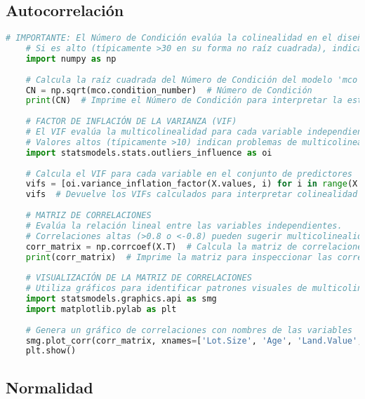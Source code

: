 \documentclass[a4paper,12pt]{article}
\begin{document}
\subsection{Autocorrelación}

\begin{lstlisting}[language=Python, style=custompython, caption={Cálculo del Número de Condición, Factor de Inflación de la Varianza (VIF) y Matriz de Correlaciones.}]
    # IMPORTANTE: El Número de Condición evalúa la colinealidad en el diseño del modelo.
    # Si es alto (típicamente >30 en su forma no raíz cuadrada), indica posible multicolinealidad.
    import numpy as np
    
    # Calcula la raíz cuadrada del Número de Condición del modelo 'mco'
    CN = np.sqrt(mco.condition_number)  # Número de Condición
    print(CN)  # Imprime el Número de Condición para interpretar la estabilidad numérica
    
    # FACTOR DE INFLACIÓN DE LA VARIANZA (VIF)
    # El VIF evalúa la multicolinealidad para cada variable independiente.
    # Valores altos (típicamente >10) indican problemas de multicolinealidad.
    import statsmodels.stats.outliers_influence as oi
    
    # Calcula el VIF para cada variable en el conjunto de predictores 'X'
    vifs = [oi.variance_inflation_factor(X.values, i) for i in range(X.shape[1])]
    vifs  # Devuelve los VIFs calculados para interpretar colinealidad
    
    # MATRIZ DE CORRELACIONES
    # Evalúa la relación lineal entre las variables independientes.
    # Correlaciones altas (>0.8 o <-0.8) pueden sugerir multicolinealidad.
    corr_matrix = np.corrcoef(X.T)  # Calcula la matriz de correlaciones de los predictores
    print(corr_matrix)  # Imprime la matriz para inspeccionar las correlaciones
    
    # VISUALIZACIÓN DE LA MATRIZ DE CORRELACIONES
    # Utiliza gráficos para identificar patrones visuales de multicolinealidad.
    import statsmodels.graphics.api as smg
    import matplotlib.pylab as plt
    
    # Genera un gráfico de correlaciones con nombres de las variables
    smg.plot_corr(corr_matrix, xnames=['Lot.Size', 'Age', 'Land.Value', 'Bedrooms'])
    plt.show()
    \end{lstlisting}

    \subsection{Normalidad}
\end{document}
